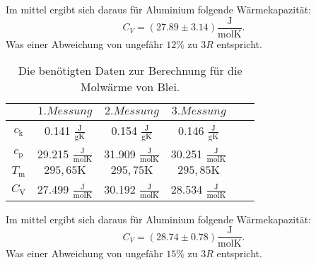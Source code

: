 Im mittel ergibt sich daraus für Aluminium folgende Wärmekapazität:
\begin{equation*}
	C_V=(27.89 \pm 3.14)\frac{\si{\joule}}{\si{\mol \kelvin}}.
\end{equation*}
Was einer Abweichung von ungefähr $12\%$ zu $3R$ entspricht.
\begin{table}[H]
	\centering
	\caption{Die benötigten Daten zur Berechnung für die Molwärme von Blei.}
	\label{tab:at_pb}
	\begin{tabular}{c c c c c c}
	\toprule
	$ $ & $1.Messung$ & $2. Messung$ & $3. Messung$ \\
	\midrule
	$c_{\text{k}}$ & 0.141 $\frac{\text{J}}{\text{gK}}$ & 0.154 $\frac{\text{J}}{\text{gK}}$ & 0.146 $\frac{\text{J}}{\text{gK}}$ \\
	$c_{\text{p}}$ & 29.215 $\frac{\si{\joule}}{\si{\mol \kelvin}}$ & 31.909 $\frac{\si{\joule}}{\si{\mol \kelvin}}$ & 30.251 $\frac{\si{\joule}}{\si{\mol \kelvin}}$ \\
	$T_{\text{m}}$ & $295,65 \si{\kelvin}$ & $295,75 \si{\kelvin}$ & $295,85 \si{\kelvin}$ \\
	\midrule
	$C_{\text{V}}$ & 27.499 $\frac{\si{\joule}}{\si{\mol \kelvin}}$ &  30.192 $\frac{\si{\joule}}{\si{\mol \kelvin}}$ &  28.534 $\frac{\si{\joule}}{\si{\mol \kelvin}}$ \\
	\bottomrule
	\end{tabular}
\end{table}
Im mittel ergibt sich daraus für Aluminium folgende Wärmekapazität:
\begin{equation*}
	C_V=(28.74 \pm 0.78)\frac{\si{\joule}}{\si{\mol \kelvin}}.
\end{equation*}
Was einer Abweichung von ungefähr $15\%$ zu $3R$ entspricht.
